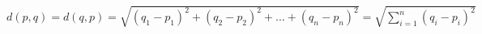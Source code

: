 \documentclass[preview]{standalone}
\begin{document}
\begin{center}
$d\left(p, q\right)=d\left(q, p\right)=\sqrt{(q_1-p_1)^2+(q_2-p_2)^2+...+(q_n-p_n)^2}=\sqrt{\sum_{i=1}^n\left(q_i-p_i\right)^2}$
\end{center}
\end{document}
